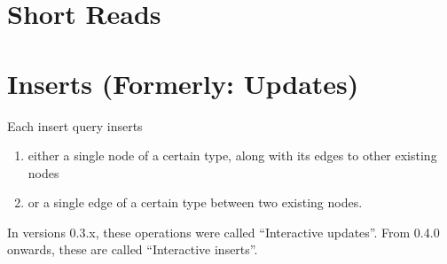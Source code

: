 \section{Short Reads}
\label{sec:interactive-short-reads}




\section{Inserts (Formerly: Updates)}
\label{sec:interactive-inserts}

Each insert query inserts

\begin{enumerate}
    \item either a single node of a certain type, along with its edges to other existing nodes
    \item or a single edge of a certain type between two existing nodes.
\end{enumerate}
In versions 0.3.x, these operations were called ``Interactive updates''.
From 0.4.0 onwards, these are called ``Interactive inserts''.


